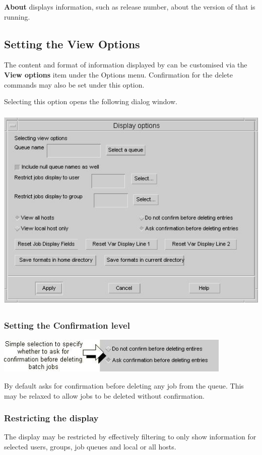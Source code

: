 \textbf{About} displays information, such as release number, about the version of \PrXmbtq{} that is running.

\subsection{Setting the View Options}
The content and format of information displayed by \XmbtqName{} can be customised via the \textbf{View options} item under the Options menu.
Confirmation for the delete commands may also be set under this option.

Selecting this option opens the following dialog window.

 \includegraphics[width=13.695cm,height=10.104cm]{img/ref26.jpg} 

\subsubsection{Setting the Confirmation level}
 \includegraphics[width=11.261cm,height=1.692cm]{img/ref27.jpg} 

By default \PrXmbtq{} asks for confirmation before deleting any job from the queue. This may be relaxed to allow jobs to
be deleted without confirmation.

\subsubsection{Restricting the display}
The display may be restricted by effectively filtering to only show information for selected users, groups, job queues and local or all
\ProductName{} hosts.

